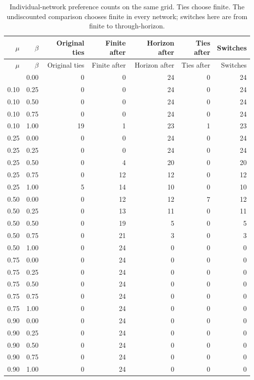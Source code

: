 \documentclass[preprint,11pt,authoryear]{elsarticle}
\begin{document}
\begingroup\small\setlength{\tabcolsep}{5pt}\begin{longtable}{rr rrrrr}
\caption{Individual-network preference counts on the same grid. Ties choose finite. The undiscounted comparison chooses finite in every network; switches here are from finite to through-horizon.}\\
\toprule $\mu$ & $\beta$ & Original ties & Finite after & Horizon after & Ties after & Switches\\\midrule
\endfirsthead
\toprule $\mu$ & $\beta$ & Original ties & Finite after & Horizon after & Ties after & Switches\\\midrule
\endhead\bottomrule\endfoot
0.10 & 0.00 & 0 & 0 & 24 & 0 & 24\\
0.10 & 0.25 & 0 & 0 & 24 & 0 & 24\\
0.10 & 0.50 & 0 & 0 & 24 & 0 & 24\\
0.10 & 0.75 & 0 & 0 & 24 & 0 & 24\\
0.10 & 1.00 & 19 & 1 & 23 & 1 & 23\\
0.25 & 0.00 & 0 & 0 & 24 & 0 & 24\\
0.25 & 0.25 & 0 & 0 & 24 & 0 & 24\\
0.25 & 0.50 & 0 & 4 & 20 & 0 & 20\\
0.25 & 0.75 & 0 & 12 & 12 & 0 & 12\\
0.25 & 1.00 & 5 & 14 & 10 & 0 & 10\\
0.50 & 0.00 & 0 & 12 & 12 & 7 & 12\\
0.50 & 0.25 & 0 & 13 & 11 & 0 & 11\\
0.50 & 0.50 & 0 & 19 & 5 & 0 & 5\\
0.50 & 0.75 & 0 & 21 & 3 & 0 & 3\\
0.50 & 1.00 & 0 & 24 & 0 & 0 & 0\\
0.75 & 0.00 & 0 & 24 & 0 & 0 & 0\\
0.75 & 0.25 & 0 & 24 & 0 & 0 & 0\\
0.75 & 0.50 & 0 & 24 & 0 & 0 & 0\\
0.75 & 0.75 & 0 & 24 & 0 & 0 & 0\\
0.75 & 1.00 & 0 & 24 & 0 & 0 & 0\\
0.90 & 0.00 & 0 & 24 & 0 & 0 & 0\\
0.90 & 0.25 & 0 & 24 & 0 & 0 & 0\\
0.90 & 0.50 & 0 & 24 & 0 & 0 & 0\\
0.90 & 0.75 & 0 & 24 & 0 & 0 & 0\\
0.90 & 1.00 & 0 & 24 & 0 & 0 & 0\\
\end{longtable}\endgroup
\end{document}
